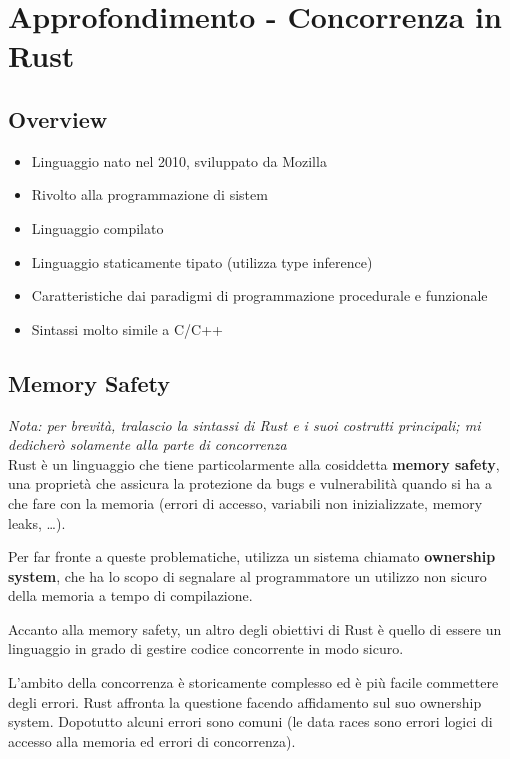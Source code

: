 \newpage
\section{Approfondimento - Concorrenza in Rust}

\subsection{Overview}

\begin{itemize}
  \item Linguaggio nato nel 2010, sviluppato da Mozilla
  \item Rivolto alla programmazione di sistem
  \item Linguaggio compilato
  \item Linguaggio staticamente tipato (utilizza type inference)
  \item Caratteristiche dai paradigmi di programmazione procedurale e funzionale
  \item Sintassi molto simile a C/C++

\end{itemize}

\subsection{Memory Safety}

\textit{Nota: per brevità, tralascio la sintassi di Rust e i suoi costrutti
principali; mi dedicherò solamente alla parte di concorrenza} \\

Rust è un linguaggio che tiene particolarmente alla cosiddetta \textbf{memory
safety}, una proprietà che assicura la protezione da bugs e vulnerabilità quando
si ha a che fare con la memoria (errori di accesso, variabili non inizializzate,
memory leaks, \dots).

Per far fronte a queste problematiche, utilizza un sistema chiamato
\textbf{ownership system}, che ha lo scopo di segnalare al programmatore un
utilizzo non sicuro della memoria a tempo di compilazione.

Accanto alla memory safety, un altro degli obiettivi di Rust è quello di essere
un linguaggio in grado di gestire codice concorrente in modo sicuro.

L'ambito della concorrenza è storicamente complesso ed è più facile commettere
degli errori. Rust affronta la questione facendo affidamento sul suo ownership
system. Dopotutto alcuni errori sono comuni (le data races sono errori logici di
accesso alla memoria ed errori di concorrenza).

